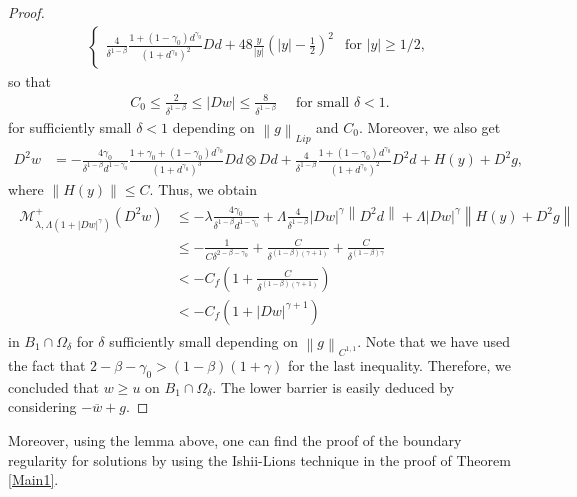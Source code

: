 \documentclass[reqno]{amsart}
\theoremstyle{plain}
\theoremstyle{definition}
\theoremstyle{remark}
\newcommand{\norm}[1]{\left\lVert#1\right\rVert}
\numberwithin{equation}{section}
\begin{document}
\begin{proof}
\begin{align*}
\begin{cases}
		\frac{4}{\delta^{1-\beta}}\frac{1+(1-\gamma_0)d^{\gamma_0}}{(1+d^{\gamma_0})^2}Dd+48\frac{y}{|y|}(|y|-\frac{1}{2})^2 & \text{for $|y| \geq 1/2$},
		\end{cases}
    \end{align*}
    so that 
    \begin{align*}
        C_0\leq\frac{2}{\delta^{1-\beta}}\leq|Dw| \leq \frac{8}{\delta^{1-\beta}} \quad \text{ for small } \delta < 1.
    \end{align*}
    for sufficiently small $\delta < 1$ depending on $\norm{g}_{Lip}$ and $C_0$.
    Moreover, we also get
    \begin{align*}
        D^2w &= -\frac{4\gamma_0 }{\delta^{1-\beta} d^{1-\gamma_0}}\frac{1+\gamma_0+(1-\gamma_0)d^{\gamma_0}}{(1+d^{\gamma_0})^3}Dd\otimes Dd + \frac{4}{\delta^{1-\beta}}\frac{1+(1-\gamma_0)d^{\gamma_0}}{(1+d^{\gamma_0})^2}D^2d +H(y) + D^2g,
    \end{align*}
    where $\norm{H(y)} \leq C$.
    Thus, we obtain
    \begin{align} \label{barcal}
    \begin{split}
        \mathcal{M}^+_{\lambda,\Lambda(1+|Dw|^\gamma)}(D^2w) &\leq-\lambda\frac{4\gamma_0 }{\delta^{1-\beta} d^{1-\gamma_0}} + \Lambda\frac{4}{\delta^{1-\beta}}|Dw|^\gamma \norm{D^2d} + \Lambda|Dw|^\gamma\norm{H(y)+D^2g} \\ 
        &\leq  -\frac{1}{C\delta^{2-\beta-\gamma_0}} + \frac{C}{\delta^{(1-\beta)(\gamma+1)} } + \frac{C}{\delta^{(1-\beta)\gamma}}  \\
        &< -C_f\left(1+\frac{C}{\delta^{(1-\beta)(\gamma+1)}}\right) \\
        & <-C_f(1+|Dw|^{\gamma+1})
        \end{split}
    \end{align}
    in $B_1 \cap \Omega_\delta$ for $\delta$ sufficiently small depending on $\norm{g}_{C^{1,1}}$. Note that we have used the fact that $2-\beta-\gamma_0 >(1-\beta)(1+\gamma)$ for the last inequality. 
    Therefore, we concluded that $ w \geq u$ on $B_1 \cap \Omega_\delta$.
    The lower barrier is easily deduced by considering $-\overline{w}+g$. 
\end{proof}
Moreover, using the lemma above, one can find the proof of the boundary regularity for solutions by using the Ishii-Lions technique in the proof of Theorem \ref{Main1}.
\end{document}
